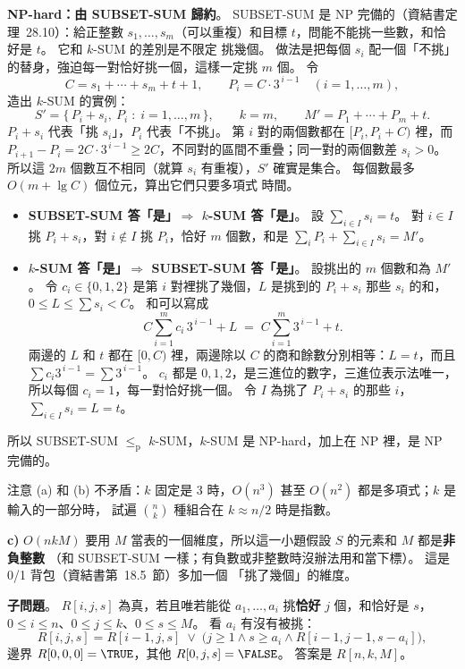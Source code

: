 \begin{pastsoln}
\textbf{NP-hard：由 SUBSET-SUM 歸約}。 SUBSET-SUM 是 NP 完備的（資結書定理~28.10）：給正整數
$s_1, \ldots, s_m$（可以重複）和目標 $t$，問能不能挑一些數，和恰好是 $t$。 它和 $k$-SUM 的差別是不限定
挑幾個。 做法是把每個 $s_i$ 配一個「不挑」的替身，強迫每一對恰好挑一個，這樣一定挑 $m$ 個。 令
\[
C = s_1 + \cdots + s_m + t + 1, \qquad P_i = C \cdot 3^{\,i-1} \quad (i = 1, \ldots, m),
\]
造出 $k$-SUM 的實例：
\[
S' = \{\, P_i + s_i,\ P_i \;:\; i = 1, \ldots, m \,\}, \qquad k = m, \qquad M' = P_1 + \cdots + P_m + t.
\]
$P_i + s_i$ 代表「挑 $s_i$」，$P_i$ 代表「不挑」。 第 $i$ 對的兩個數都在 $[P_i, P_i + C)$ 裡，而
$P_{i+1} - P_i = 2C \cdot 3^{\,i-1} \ge 2C$，不同對的區間不重疊；同一對的兩個數差 $s_i > 0$。 所以這 $2m$
個數互不相同（就算 $s_i$ 有重複），$S'$ 確實是集合。 每個數最多 $O(m + \lg C)$ 個位元，算出它們只要多項式
時間。
\begin{itemize}
\item \textbf{SUBSET-SUM 答「是」$\Rightarrow$ $k$-SUM 答「是」}。 設 $\sum_{i \in I} s_i = t$。 對 $i \in I$ 挑
$P_i + s_i$，對 $i \notin I$ 挑 $P_i$，恰好 $m$ 個數，和是 $\sum_i P_i + \sum_{i \in I} s_i = M'$。
\item \textbf{$k$-SUM 答「是」$\Rightarrow$ SUBSET-SUM 答「是」}。 設挑出的 $m$ 個數和為 $M'$。 令 $c_i \in \{0, 1, 2\}$
是第 $i$ 對裡挑了幾個，$L$ 是挑到的 $P_i + s_i$ 那些 $s_i$ 的和，$0 \le L \le \sum s_i < C$。 和可以寫成
\[
C \sum_{i=1}^{m} c_i\, 3^{\,i-1} + L \;=\; C \sum_{i=1}^{m} 3^{\,i-1} + t .
\]
兩邊的 $L$ 和 $t$ 都在 $[0, C)$ 裡，兩邊除以 $C$ 的商和餘數分別相等：$L = t$，而且
$\sum c_i 3^{\,i-1} = \sum 3^{\,i-1}$。 $c_i$ 都是 $0, 1, 2$，是三進位的數字，三進位表示法唯一，所以每個
$c_i = 1$，每一對恰好挑一個。 令 $I$ 為挑了 $P_i + s_i$ 的那些 $i$，$\sum_{i \in I} s_i = L = t$。
\end{itemize}
所以 SUBSET-SUM $\le_{\mathrm{p}}$ $k$-SUM，$k$-SUM 是 NP-hard，加上在 NP 裡，是 NP 完備的。

注意 (a) 和 (b) 不矛盾：$k$ 固定是 $3$ 時，$O(n^3)$ 甚至 $O(n^2)$ 都是多項式；$k$ 是輸入的一部分時，
試遍 $\binom{n}{k}$ 種組合在 $k \approx n/2$ 時是指數。

\textbf{c)} $O(nkM)$ 要用 $M$ 當表的一個維度，所以這一小題假設 $S$ 的元素和 $M$ 都是\textbf{非負整數}
（和 SUBSET-SUM 一樣；有負數或非整數時沒辦法用和當下標）。 這是 0/1 背包（資結書第~18.5~節）多加一個
「挑了幾個」的維度。

\textbf{子問題}。 $R[i, j, s]$ 為真，若且唯若能從 $a_1, \ldots, a_i$ 挑\textbf{恰好} $j$ 個，和恰好是 $s$，
$0 \le i \le n$、$0 \le j \le k$、$0 \le s \le M$。 看 $a_i$ 有沒有被挑：
\[
R[i, j, s] = R[i-1, j, s] \;\lor\; \bigl(j \ge 1 \land s \ge a_i \land R[i-1, j-1, s - a_i]\bigr),
\]
邊界 $R[0, 0, 0] = \TRUE$，其他 $R[0, j, s] = \FALSE$。 答案是 $R[n, k, M]$。


\end{pastsoln}
